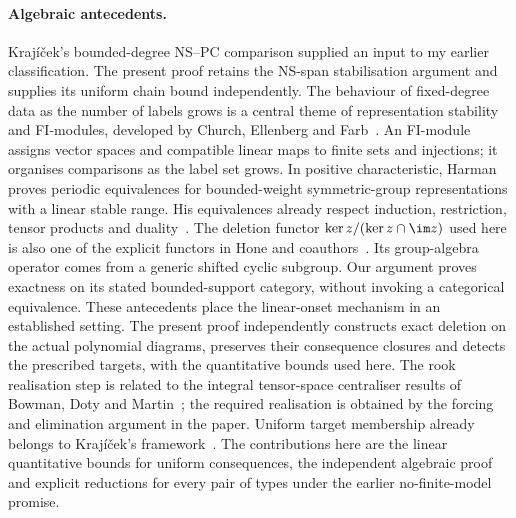 \paragraph{Algebraic antecedents.}
Kraj\'i\v cek's bounded-degree NS--PC comparison
\cite[Theorem~5.5]{Krajicek}
supplied an input to my earlier classification. The present proof
retains the NS-span stabilisation argument and supplies its uniform
chain bound independently. The behaviour of fixed-degree data as the
number of labels grows is a central theme of representation stability
and FI-modules, developed by Church, Ellenberg and Farb~\cite{CEF}.
An FI-module assigns vector spaces and compatible linear maps to finite
sets and injections; it organises comparisons as the label set grows. In positive
characteristic, Harman~\cite{Harman} proves periodic equivalences for
bounded-weight symmetric-group representations with a linear stable
range. His equivalences already respect induction, restriction, tensor
products and duality~\cite[Propositions~2.7 and~2.12]{Harman}.
The deletion functor $\ker z/(\ker z\cap\im z)$ used here is also
one of the explicit functors in Hone and coauthors~\cite[Theorem~A]{HKPSYZ}.
Its group-algebra operator comes from a generic shifted cyclic subgroup.
Our argument proves exactness on its stated bounded-support category,
without invoking a categorical equivalence. These antecedents place
the linear-onset mechanism in an established setting. The
present proof independently constructs exact deletion on the actual
polynomial diagrams, preserves their consequence closures and detects
the prescribed targets, with the quantitative bounds used here. The rook
realisation step is related to the integral tensor-space centraliser
results of Bowman, Doty and Martin~\cite{BDM}; the required realisation
is obtained by the forcing and elimination argument in the paper.
Uniform target membership already belongs to Kraj\'i\v cek's
framework~\cite{KrajEuler,Krajicek}. The contributions here are the
linear quantitative bounds for uniform consequences, the independent
algebraic proof and explicit reductions for every pair of types under
the earlier no-finite-model promise.

